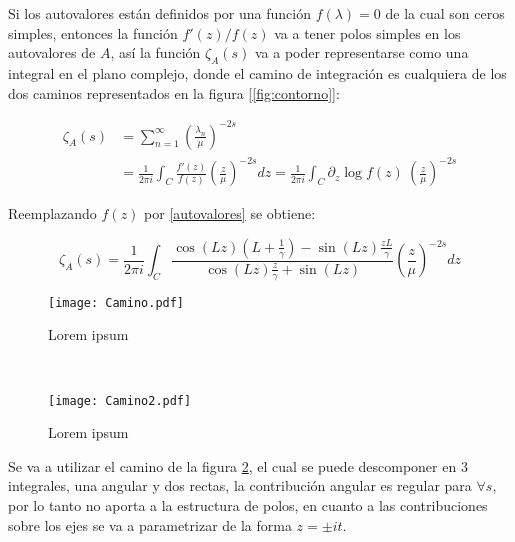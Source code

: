 Si los  autovalores están definidos por una función $f(\lambda ) = 0$ de la cual son ceros simples, entonces la función $f'(z) / f(z) $ va a tener polos simples en los autovalores de $A$, así la  función $\zeta _A (s)$ va a poder representarse como una integral en el plano complejo, donde el camino de integración es cualquiera de los dos caminos representados en la figura [\ref{fig:contorno}]:

\begin{equation}
\begin{aligned}
   \zeta _A (s) &=  \sum _{n=1} ^{\infty} \left( \frac{\lambda _n}{\mu} \right) ^{-2s} \\[5pt] &=  
   \frac{1}{2 \pi i} \int _{C} \frac{f'(z)}{f(z)} \left( \frac{z}{\mu} \right) ^{-2s} dz 
   =  \frac{1}{2 \pi i} \int _{C} \partial _z \log f(z) \ 
	   \left( \frac{z}{\mu} \right) ^{-2s}
\end{aligned}
\label{asd}
\end{equation}

Reemplazando $f(z)$ por  \ref{autovalores} se obtiene:

\begin{equation}
	\zeta _A (s) = 
    \frac{1}{2 \pi i} \int _{C}
    \frac{ \cos (L z) \left(L + \frac{1}{\gamma} \right) - \sin(L z) \frac{z L}{\gamma}
    }
    { \cos(L z) \frac{z}{\gamma} + \sin(L z)
    }
    \left( \frac{z}{\mu} \right) ^{-2 s} dz
\end{equation}


\begin{figure*}[t!]
    \centering
    \begin{subfigure}[t]{0.5\textwidth}
        \centering
        \texttt{[image: Camino.pdf]}
        \caption{Lorem ipsum}
        \label{fig.izquierda}
    \end{subfigure}%
    ~ 
    \begin{subfigure}[t]{0.5\textwidth}
        \centering
        \texttt{[image: Camino2.pdf]}
        \caption{Lorem ipsum}
        \label{fig.derecha}
    \end{subfigure}
    \caption{Camino tenido en cuenta para realizar la integral de contorno en el plano complejo}
\label{fig:contorno}
\end{figure*}


Se va a utilizar el camino de la figura \ref{fig.derecha}, el cual se puede descomponer en 3 integrales, una angular y dos rectas, la contribución angular es regular para $ \forall s$, por lo tanto no aporta a la estructura de polos, en cuanto a las contribuciones sobre los ejes se va a parametrizar de la forma $z = \pm i  t$. \\ 


